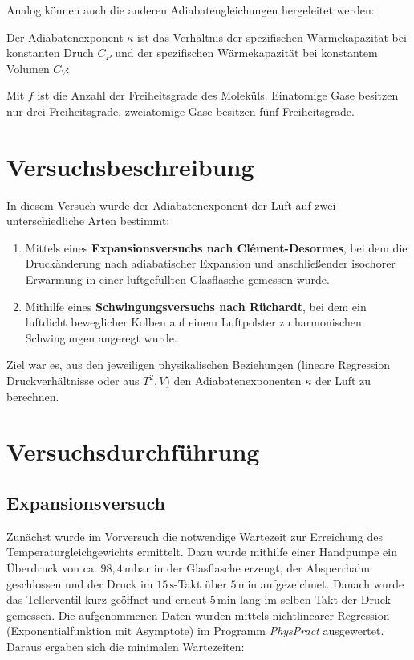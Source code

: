 \documentclass{protokoll}
\begin{document}

Analog können auch die anderen Adiabatengleichungen hergeleitet werden:


Der Adiabatenexponent $\kappa$ ist das Verhältnis der spezifischen
Wärmekapazität bei konstanten Druch $C_P$ und der spezifischen  Wärmekapazität
bei konstantem Volumen $C_V$:


Mit $f$ ist die Anzahl der Freiheitsgrade des Moleküls. Einatomige Gase besitzen
nur drei Freiheitsgrade, zweiatomige Gase besitzen fünf Freiheitsgrade.

\section{Versuchsbeschreibung}

In diesem Versuch wurde der Adiabatenexponent der Luft auf zwei unterschiedliche 
Arten bestimmt:

\begin{enumerate}
    \item Mittels eines \textbf{Expansionsversuchs nach Clément-Desormes}, 
    bei dem die Druckänderung nach adiabatischer Expansion und anschließender 
    isochorer Erwärmung in einer luftgefüllten Glasflasche gemessen wurde.
    \item Mithilfe eines \textbf{Schwingungsversuchs nach Rüchardt}, bei 
    dem ein luftdicht beweglicher Kolben auf einem Luftpolster zu harmonischen 
    Schwingungen angeregt wurde.
\end{enumerate}

Ziel war es, aus den jeweiligen physikalischen Beziehungen 
(lineare Regression Druckverhältnisse oder aus $T^2, V$) den Adiabatenexponenten 
$\kappa$ der Luft zu berechnen.

\section{Versuchsdurchführung}

\subsection{Expansionsversuch}

Zunächst wurde im Vorversuch die notwendige Wartezeit zur Erreichung des 
Temperaturgleichgewichts ermittelt. Dazu wurde mithilfe einer Handpumpe ein
Überdruck von ca. $98{,}4 \, \mathrm{mbar}$ in der Glasflasche erzeugt, der 
Absperrhahn geschlossen und der Druck im $15 \, \mathrm{s}$-Takt über $5 \, 
\mathrm{min}$ aufgezeichnet. Danach wurde das Tellerventil kurz geöffnet und 
erneut $5 \, \mathrm{min}$ lang im selben Takt der Druck gemessen. Die 
aufgenommenen Daten wurden mittels nichtlinearer Regression (Exponentialfunktion 
mit Asymptote) im Programm \textit{PhysPract} ausgewertet. Daraus ergaben sich 
die minimalen Wartezeiten:
\end{document}
